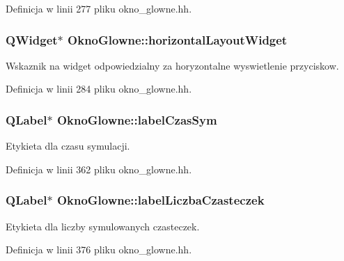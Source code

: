 Definicja w linii 277 pliku okno\-\_\-glowne.\-hh.

\hypertarget{class_okno_glowne_a12ac2d00b9ca186176ccc710a928a723}{
\subsubsection[{horizontal\-Layout\-Widget}]{\setlength{\rightskip}{0pt plus 5cm}Q\-Widget$\ast$ Okno\-Glowne\-::horizontal\-Layout\-Widget\hspace{0.3cm}{\ttfamily [private]}}}\label{class_okno_glowne_a12ac2d00b9ca186176ccc710a928a723}
Wskaznik na widget odpowiedzialny za horyzontalne wyswietlenie przyciskow. 

Definicja w linii 284 pliku okno\-\_\-glowne.\-hh.

\hypertarget{class_okno_glowne_aca07e1dc5cbe30d6952f9b952073bb79}{
\subsubsection[{label\-Czas\-Sym}]{\setlength{\rightskip}{0pt plus 5cm}Q\-Label$\ast$ Okno\-Glowne\-::label\-Czas\-Sym\hspace{0.3cm}{\ttfamily [private]}}}\label{class_okno_glowne_aca07e1dc5cbe30d6952f9b952073bb79}
Etykieta dla czasu symulacji. 

Definicja w linii 362 pliku okno\-\_\-glowne.\-hh.

\hypertarget{class_okno_glowne_ab01460f1222d0ec2892abf21efb23078}{
\subsubsection[{label\-Liczba\-Czasteczek}]{\setlength{\rightskip}{0pt plus 5cm}Q\-Label$\ast$ Okno\-Glowne\-::label\-Liczba\-Czasteczek\hspace{0.3cm}{\ttfamily [private]}}}\label{class_okno_glowne_ab01460f1222d0ec2892abf21efb23078}
Etykieta dla liczby symulowanych czasteczek. 

Definicja w linii 376 pliku okno\-\_\-glowne.\-hh.

